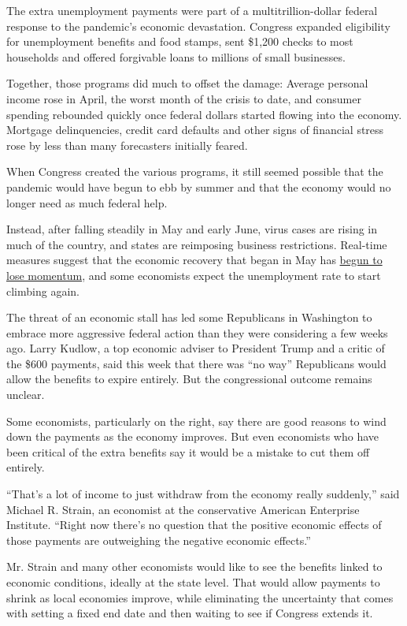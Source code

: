 The extra unemployment payments were part of a multitrillion-dollar
federal response to the pandemic's economic devastation. Congress
expanded eligibility for unemployment benefits and food stamps, sent
\$1,200 checks to most households and offered forgivable loans to
millions of small businesses.

Together, those programs did much to offset the damage: Average personal
income rose in April, the worst month of the crisis to date, and
consumer spending rebounded quickly once federal dollars started flowing
into the economy. Mortgage delinquencies, credit card defaults and other
signs of financial stress rose by less than many forecasters initially
feared.

When Congress created the various programs, it still seemed possible
that the pandemic would have begun to ebb by summer and that the economy
would no longer need as much federal help.

Instead, after falling steadily in May and early June, virus cases are
rising in much of the country, and states are reimposing business
restrictions. Real-time measures suggest that the economic recovery that
began in May has
\href{https://www.nytimes3xbfgragh.onion/live/2020/07/15/business/stock-market-today-coronavirus\#surging-virus-cases-and-renewed-lockdowns-threaten-economic-recovery}{begun
to lose momentum}, and some economists expect the unemployment rate to
start climbing again.

The threat of an economic stall has led some Republicans in Washington
to embrace more aggressive federal action than they were considering a
few weeks ago. Larry Kudlow, a top economic adviser to President Trump
and a critic of the \$600 payments, said this week that there was ``no
way'' Republicans would allow the benefits to expire entirely. But the
congressional outcome remains unclear.

Some economists, particularly on the right, say there are good reasons
to wind down the payments as the economy improves. But even economists
who have been critical of the extra benefits say it would be a mistake
to cut them off entirely.

``That's a lot of income to just withdraw from the economy really
suddenly,'' said Michael R. Strain, an economist at the conservative
American Enterprise Institute. ``Right now there's no question that the
positive economic effects of those payments are outweighing the negative
economic effects.''

Mr. Strain and many other economists would like to see the benefits
linked to economic conditions, ideally at the state level. That would
allow payments to shrink as local economies improve, while eliminating
the uncertainty that comes with setting a fixed end date and then
waiting to see if Congress extends it.

